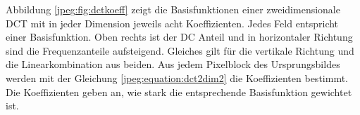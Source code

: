 Abbildung \ref{jpeg:fig:dctkoeff} zeigt die Basisfunktionen einer zweidimensionale DCT mit in jeder Dimen\-sion jeweils acht Koeffizienten.
Jedes Feld entspricht einer Basisfunktion.
Oben rechts ist der DC Anteil und in horizontaler Richtung sind die Frequenzanteile aufsteigend.
Gleiches gilt für die vertikale Richtung und die Linearkombination aus beiden.
Aus jedem Pixelblock des Ursprungsbildes werden mit der Gleichung \eqref{jpeg:equation:dct2dim2} die Koeffizienten bestimmt.
Die Koeffizienten geben an, wie stark die entsprechende Basisfunktion gewichtet ist. 



